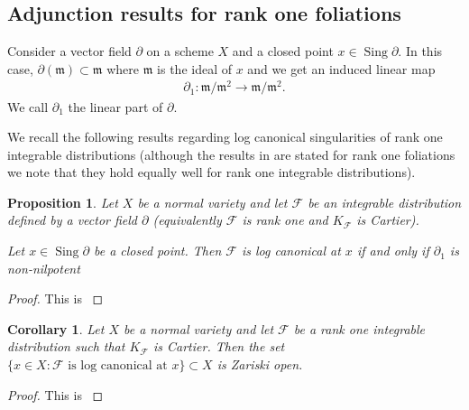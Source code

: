 \documentclass[12pt, a4paper]{amsart}
\DeclareMathOperator{\sing}{Sing}
\newtheorem{proposition}[theorem]{Proposition}
\newtheorem{corollary}[theorem]{Corollary}
\theoremstyle{definition}
\theoremstyle{named}
\begin{document}
\subsection{Adjunction results for rank one foliations}
Consider a vector field $\partial$ on a scheme $X$ and a closed point $x \in \sing \partial$.
In this case, $\partial(\mathfrak m)\subset \mathfrak m$ where $\mathfrak m$ is the ideal of $x$ and we get an induced linear map
\begin{align*}\partial_1\colon \mathfrak m/\mathfrak m^2
\to \mathfrak m/\mathfrak m^2.\end{align*}
We call $\partial_1$ the linear part of $\partial$.



We recall the following results regarding log canonical singularities of rank one integrable distributions (although the results in \cite{MP13} are stated for rank one foliations we note that they hold equally well for rank one integrable distributions).

\begin{proposition}
\label{prop_lc_nonnilp}
    Let $X$ be a normal variety and let $\mathcal F$
    be an integrable distribution defined by a vector field 
    $\partial$ (equivalently $\mathcal F$ is rank one and $K_{\mathcal F}$ is Cartier).

    Let $x \in \sing \partial$ be a closed point.
    Then $\mathcal F$ is log canonical at $x$ if and only 
    if $\partial_1$ is non-nilpotent
\end{proposition}
\begin{proof}
This is \cite[Fact I.ii.4]{MP13}
\end{proof}



\begin{corollary}
\label{cor_lc_is_open}
    Let $X$ be a normal variety and let $\mathcal F$
    be a rank one integrable distribution such that $K_{\mathcal F}$
    is Cartier.  Then the set 
    $\{ x \in X: \mathcal F \text{ is log canonical at } x\} \subset X$ is Zariski open.
\end{corollary}
\begin{proof}
    This is \cite[Definition-Summary I.ii.6]{MP13}
\end{proof}
\end{document}
